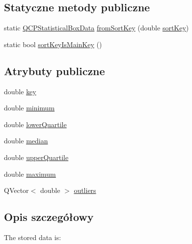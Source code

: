 \subsection*{Statyczne metody publiczne}
\begin{DoxyCompactItemize}
\item 
static \hyperlink{class_q_c_p_statistical_box_data}{Q\+C\+P\+Statistical\+Box\+Data} \hyperlink{class_q_c_p_statistical_box_data_a8c391d5a6c7cebc79b664aad9917b499}{from\+Sort\+Key} (double \hyperlink{class_q_c_p_statistical_box_data_ad00ab8d43ec89a40ec7ee7ca154a2b0e}{sort\+Key})
\item 
static bool \hyperlink{class_q_c_p_statistical_box_data_a4710ae44b85d4b34b13c3f9301f28c01}{sort\+Key\+Is\+Main\+Key} ()
\end{DoxyCompactItemize}
\subsection*{Atrybuty publiczne}
\begin{DoxyCompactItemize}
\item 
double \hyperlink{class_q_c_p_statistical_box_data_a2d0b5ca5130e8a73294c46b8b2fd77b8}{key}
\item 
double \hyperlink{class_q_c_p_statistical_box_data_adc2f4b8cbff9f2e4a676f32bad8a7e3a}{minimum}
\item 
double \hyperlink{class_q_c_p_statistical_box_data_af9f478b4ea0789fa6cff7eebb654b5d4}{lower\+Quartile}
\item 
double \hyperlink{class_q_c_p_statistical_box_data_a116cd53ae6685979ec3b051cfc7dbba5}{median}
\item 
double \hyperlink{class_q_c_p_statistical_box_data_a5604dfe04b103e5ac73ce7895b46303b}{upper\+Quartile}
\item 
double \hyperlink{class_q_c_p_statistical_box_data_aa2800abda337decfc4277cb8bf846d6f}{maximum}
\item 
Q\+Vector$<$ double $>$ \hyperlink{class_q_c_p_statistical_box_data_abaa27539fbd941d3f1eb8169e881e308}{outliers}
\end{DoxyCompactItemize}


\subsection{Opis szczegółowy}
The stored data is\+:

